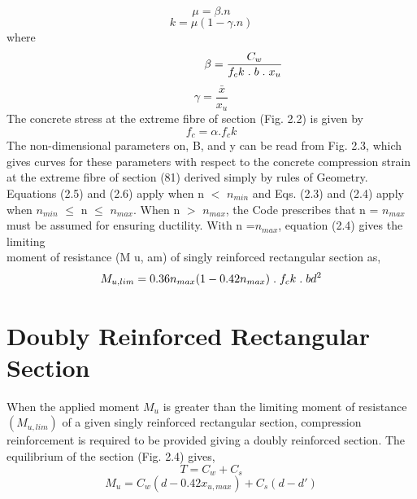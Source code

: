 \newpage
\begin{equation}
\mu=\beta.n
\end{equation}
\begin{equation}
k=\mu(1-\gamma.n)
\end{equation}
where
\begin{equation}
\hspace{2cm} \beta = \frac{C_w}{f_ck\hspace{0.1cm}.\hspace{0.1cm}b\hspace{0.1cm}.\hspace{0.1cm}x_u}
\end{equation}
\begin{equation}
\gamma = \frac{\bar{x}}{x_u}
\end{equation}
The concrete stress at the extreme ﬁbre of section (Fig. 2.2) is given by
\begin{equation}
f_c = \alpha.f_ck
\end{equation}
The non-dimensional parameters on, B, and y can be read from Fig. 2.3, which gives curves for
these parameters with respect to the concrete compression strain at the extreme ﬁbre of section
(81) derived simply by rules of Geometry.\\
Equations (2.5) and (2.6) apply when n ${<}$ ${n_{min}}$ and Eqs. (2.3) and (2.4) apply when ${n_{min}}$ ${\leq}$ n ${\leq}$ ${n_{max}}$.
When n ${>}$ ${n_{max}}$, the Code prescribes that n = ${n_{max}}$ must be assumed for
ensuring ductility. With n =${n_{max}}$, equation (2.4) gives the limiting \\
moment of resistance
(M u, am) of singly reinforced rectangular section as,
\begin{equation}
M_{u,lim} = 0.36 n_{max}(1-0.42n_{max})\hspace{0.1cm}.\hspace{0.1cm}f_ck\hspace{0.1cm}.\hspace{0.1cm}bd^2
\end{equation}
\section{Doubly Reinforced Rectangular Section}
When the applied moment ${M_u}$ is greater than the limiting moment of resistance ${(M_{u,lim})}$
of a given singly reinforced rectangular section, compression reinforcement is required to be
provided giving a doubly reinforced section. The equilibrium of the section (Fig. 2.4) gives,
\begin{equation}
T = C_w + C_s
\end{equation}
\begin{equation}
M_u = C_w(d-0.42x_{u,max}) + C_s(d-d ')
\end{equation}

